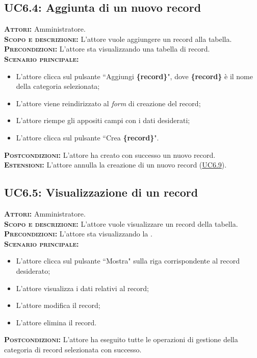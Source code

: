 \subsection{UC6.4: Aggiunta di un nuovo record}
\label{sec:UC64}
\textsc{\textbf{Attori:}} Amministratore.\\
\textsc{\textbf{Scopo e descrizione:}} L'attore vuole aggiungere un record alla tabella.\\
\textsc{\textsc{\textbf{Precondizioni:}}} L'attore sta visualizzando una tabella di record.\\
\textsc{\textbf{Scenario principale:}} 
\begin{itemize}
    \item L'attore clicca sul pulsante ``Aggiungi \textbf{\{record\}}", dove \textbf{\{record\}} è il nome della categoria selezionata;
    \item L'attore viene reindirizzato al \textit{form} di creazione del record;
    \item L'attore riempe gli appositi campi con i dati desiderati;
    \item L'attore clicca sul pulsante ``Crea \textbf{\{record\}}".
\end{itemize}
\textsc{\textbf{Postcondizioni:}} L'attore ha creato con successo un nuovo record.\\
\textsc{\textbf{Estensioni:}} L'attore annulla la creazione di un nuovo record (\hyperref[sec:UC69]{UC6.9}).

\subsection{UC6.5: Visualizzazione di un record}
\label{sec:UC65}
\textsc{\textbf{Attori:}} Amministratore.\\
\textsc{\textbf{Scopo e descrizione:}} L'attore vuole visualizzare un record della tabella.\\
\textsc{\textsc{\textbf{Precondizioni:}}} L'attore sta visualizzando la .\\
\textsc{\textbf{Scenario principale:}} 
\begin{itemize}
    \item L'attore clicca sul pulsante ``Mostra" sulla riga corrispondente al record desiderato;
    \item L'attore visualizza i dati relativi al record;
    \item L'attore modifica il record;
    \item L'attore elimina il record.
\end{itemize}
\textsc{\textbf{Postcondizioni:}} L'attore ha eseguito tutte le operazioni di gestione della categoria di record selezionata con successo.

